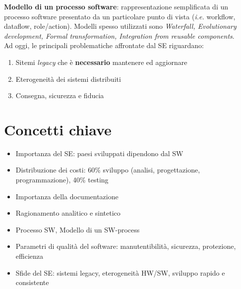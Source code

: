 \textbf{Modello di un processo software}: rappresentazione semplificata
di un processo software presentato da un particolare punto di vista
(\textit{i.e.} workflow, dataflow, role/action).
Modelli spesso utilizzati sono \textit{Waterfall, Evolutionary development,
Formal transformation, Integration from reusable components}.\\

Ad oggi, le principali problematiche affrontate dal SE riguardano:
\begin{enumerate}
      \item Sitemi \textit{legacy} che \`e \textbf{necessario}
            mantenere ed aggiornare
      \item Eterogeneit\`a dei sistemi distribuiti
      \item Consegna, sicurezza e fiducia
\end{enumerate}

\newpage
\section{Concetti chiave}

\begin{itemize}
      \item Importanza del SE: paesi sviluppati dipendono dal SW
      \item Distribuzione dei costi: 60\% sviluppo (analisi,
            progettazione, programmazione), 40\% testing
      \item Importanza della documentazione
      \item Ragionamento analitico e sintetico
      \item Processo SW, Modello di un SW-process
      \item Parametri di qualit\`a del software: manutentibilit\`a,
            sicurezza, protezione, efficienza
      \item Sfide del SE: sistemi legacy, eterogeneit\`a HW/SW,
            sviluppo rapido e consistente
\end{itemize}